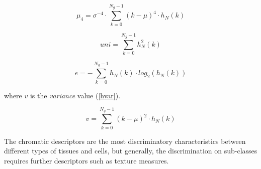 \documentclass[final,a4paper,12pt,english]{UnicaPhdThesis3}
\begin{document}
\begin{equation}\label{hkurt}
\mu_4 =\sigma^{-4} \cdot \sum_{k=0}^{N_{g}-1} (k - \mu)^4 \cdot h_N(k)
\end{equation}

\begin{equation}\label{huni}
uni=\sum_{k=0}^{N_{g}-1} h_N ^2 (k)
\end{equation}

\begin{equation}\label{hent}
e=-\sum_{k=0}^{N_{g}-1}  h_N(k) \cdot  log_2(h_N(k))
\end{equation}

where $v$ is the \textit{variance} value (\ref{hvar}). 

\begin{equation}\label{hvar}
v=\sum_{k=0}^{N_{g}-1} (k - \mu)^2 \cdot h_N(k)
\end{equation}

The chromatic descriptors are the most discriminatory characteristics between different types of tissues and cells, but generally, the discrimination on sub-classes requires further descriptors such as texture measures.
\end{document}

